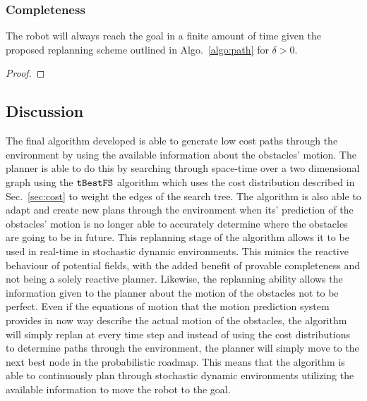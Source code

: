 \subsubsection{Completeness}

\begin{theorem}

    The robot will always reach the goal in a finite amount of time given the
    proposed replanning scheme outlined in Algo.~\ref{algo:path} for $\delta >
    0$.

\end{theorem}

\begin{proof}



\end{proof}

\subsection{Discussion}

\label{sec:plannerdiscussion}

The final algorithm developed is able to generate low cost paths through the
environment by using the available information about the obstacles' motion. The
planner is able to do this by searching through space-time over a two
dimensional graph using the $\Acronym{tBestFS}$ algorithm which uses the cost
distribution described in Sec.~\ref{sec:cost} to weight the edges of the search
tree. The algorithm is also able to adapt and create new plans through the
environment when its' prediction of the obstacles' motion is no longer able to
accurately determine where the obstacles are going to be in future. This
replanning stage of the algorithm allows it to be used in real-time in
stochastic dynamic environments. This mimics the reactive behaviour of
potential fields, with the added benefit of provable completeness and not being
a solely reactive planner. Likewise, the replanning ability allows the
information given to the planner about the motion of the obstacles not to be
perfect. Even if the equations of motion that the motion prediction system
provides in now way describe the actual motion of the obstacles, the algorithm
will simply replan at every time step and instead of using the cost
distributions to determine paths through the environment, the planner will
simply move to the next best node in the probabilistic roadmap. This means that
the algorithm is able to continuously plan through stochastic dynamic
environments utilizing the available information to move the robot to the goal.


